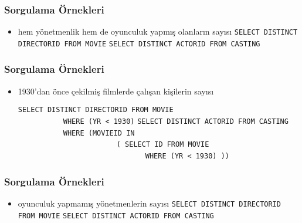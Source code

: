 \documentclass[dvipsnames]{beamer}
\theoremstyle{plain}
\begin{document}
\begin{frame}[fragile]
  \frametitle{Sorgulama Örnekleri}

  \begin{itemize}
    \item hem yönetmenlik hem de oyunculuk yapmış olanların sayısı
    \medskip
{}
\lstinline!SELECT DISTINCT DIRECTORID FROM MOVIE!
\lstinline!SELECT DISTINCT ACTORID FROM CASTING!
  \end{itemize}
\end{frame}


\begin{frame}[fragile]
  \frametitle{Sorgulama Örnekleri}

  \begin{itemize}
    \item 1930'dan önce çekilmiş filmlerde çalışan kişilerin sayısı
    
    \medskip
{}
\lstinline!SELECT DISTINCT DIRECTORID FROM MOVIE!\\
~~~~~~~~~~~\lstinline!WHERE (YR < 1930)!
\lstinline!SELECT DISTINCT ACTORID FROM CASTING!\\
~~~~~~~~~~~\lstinline!WHERE (MOVIEID IN!\\
~~~~~~~~~~~~~~~~~~~~~~~~\lstinline!( SELECT ID FROM MOVIE!\\
~~~~~~~~~~~~~~~~~~~~~~~~~~~~~~~\lstinline!WHERE (YR < 1930) ))!
  \end{itemize}
\end{frame}

\begin{frame}[fragile]
  \frametitle{Sorgulama Örnekleri}

  \begin{itemize}
    \item oyunculuk yapmamış yönetmenlerin sayısı
    \medskip
{}
\lstinline!SELECT DISTINCT DIRECTORID FROM MOVIE!
\lstinline!SELECT DISTINCT ACTORID FROM CASTING!
  \end{itemize}
\end{frame}
\end{document}
